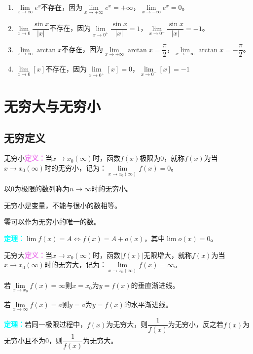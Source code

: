 \documentclass[UTF8, 12pt]{ctexart}
\begin{document}
    \begin{enumerate}
        \item $\lim\limits_{x\to\infty}e^x$不存在，因为$\lim\limits_{x\to +\infty}e^x=+\infty$，$\lim\limits_{x\to -\infty}e^x=0$。
        \item $\lim\limits_{x\to 0}\dfrac{\sin x}{\vert x\vert}$不存在，因为$\lim\limits_{x\to 0^+}\dfrac{\sin x}{\vert x\vert}=1$，$\lim\limits_{x\to 0^-}\dfrac{\sin x}{\vert x\vert}=-1$。
        \item $\lim\limits_{x\to\infty}\arctan x$不存在，因为$\lim\limits_{x\to +\infty}\arctan x=\dfrac{\pi}{2}$，$\lim\limits_{x\to -\infty}\arctan x=-\dfrac{\pi}{2}$。
        \item $\lim\limits_{x\to 0}[x]$不存在，因为$\lim\limits_{x\to 0^+}[x]=0$，$\lim\limits_{x\to 0^-}[x]=-1$
    \end{enumerate}


    \section{无穷大与无穷小}

    \subsection{无穷定义}

    无穷小\textcolor{violet}{\textbf{定义：}}当$x\to x_0(\infty)$时，函数$f(x)$极限为0，就称$f(x)$为当$x\to x_0(\infty)$时的无穷小，记为：$\lim\limits_{x\to x_0(\infty)}f(x)=0$。

    以0为极限的数列称为$n\to\infty$时的无穷小。

    无穷小是变量，不能与很小的数相等。

    零可以作为无穷小的唯一的数。

    \textcolor{aqua}{\textbf{定理：}}$\lim f(x)=A\Leftrightarrow f(x)=A+o(x)$，其中$\lim o(x)=0$。

    无穷大\textcolor{violet}{\textbf{定义：}}当$x\to x_0(\infty)$时，函数$\vert f(x)\vert$无限增大，就称$f(x)$为当$x\to x_0(\infty)$时的无穷大，记为：$\lim\limits_{x\to x_0(\infty)}f(x)=\infty$。

    若$\lim\limits_{x\to x_0}f(x)=\infty$则$x=x_0$为$y=f(x)$的垂直渐进线。

    若$\lim\limits_{x\to\infty}f(x)=a$则$y=a$为$y=f(x)$的水平渐进线。

    \textcolor{aqua}{\textbf{定理：}}若同一极限过程中，$f(x)$为无穷大，则$\dfrac{1}{f(x)}$为无穷小，反之若$f(x)$为无穷小且不为0，则$\dfrac{1}{f(x)}$为无穷大。
\end{document}
